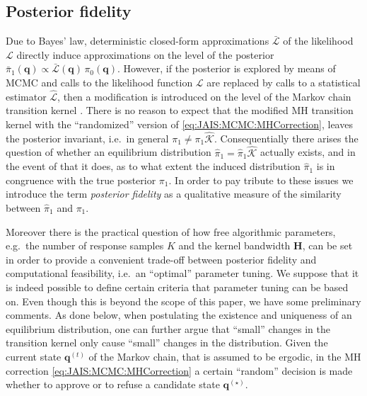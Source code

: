 \subsection{Posterior fidelity} \label{sec:JAIS:Computation:PosteriorFidelity}
Due to Bayes' law, deterministic closed-form approximations \(\bar{\mathcal{L}}\) of the likelihood \(\mathcal{L}\)
directly induce approximations on the level of the posterior \(\bar{\pi}_1(\bm{q}) \propto \bar{\mathcal{L}}(\bm{q}) \, \pi_0(\bm{q})\).
However, if the posterior is explored by means of MCMC and calls to the likelihood function \(\mathcal{L}\) are replaced by calls to a statistical estimator \(\hat{\mathcal{L}}\),
then a modification is introduced on the level of the Markov chain transition kernel \cite{MCMC:ONeill2000,MCMC:Beaumont2003}.
There is no reason to expect that the modified MH transition kernel with the ``randomized'' version of \cref{eq:JAIS:MCMC:MHCorrection},
leaves the posterior invariant, i.e.\ in general \(\pi_1 \neq \pi_1 \hat{\mathcal{K}}\).
Consequentially there arises the question of whether an equilibrium distribution \(\hat{\pi}_1 = \hat{\pi}_1 \hat{\mathcal{K}}\) actually exists,
and in the event of that it does, as to what extent the induced distribution \(\hat{\pi}_1\) is in congruence with the true posterior \(\pi_1\).
In order to pay tribute to these issues we introduce the term \textit{posterior fidelity} as a qualitative measure of the similarity between \(\hat{\pi}_1\) and \(\pi_1\).
\par %
Moreover there is the practical question of how free algorithmic parameters, e.g.\ the number of response samples \(K\) and the kernel bandwidth \(\bm{H}\),
can be set in order to provide a convenient trade-off between posterior fidelity and computational feasibility, i.e.\ an ``optimal'' parameter tuning.
We suppose that it is indeed possible to define certain criteria that parameter tuning can be based on.
Even though this is beyond the scope of this paper, we have some preliminary comments.
As done below, when postulating the existence and uniqueness of an equilibrium distribution,
one can further argue that ``small'' changes in the transition kernel only cause ``small'' changes in the distribution.
Given the current state \(\bm{q}^{(t)}\) of the Markov chain, that is assumed to be ergodic, in the MH correction \cref{eq:JAIS:MCMC:MHCorrection}
a certain ``random'' decision is made whether to approve or to refuse a candidate state \(\bm{q}^{(\star)}\).
